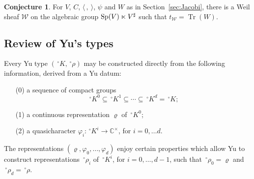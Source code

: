 \documentclass[10pt]{amsart}
\theoremstyle{plain}
\theoremstyle{definition}
\newtheorem{conjecture}[theorem]{Conjecture}
\newcommand{\CC}{{\mathbb{C}}}
\DeclareMathOperator{\trace}{Tr}
\newcommand{\trFrob}[1]{t_{#1}}
\newcommand{\cs}[1]{{\mathcal{#1}}}
\begin{document}
\begin{conjecture}\label{conj:Jacobi}
For $V$, $C$, $\langle\, , \ \rangle$, $\psi$ and $W$ as in Section~\ref{sec:Jacobi}, there is a Weil sheaf $\cs{W}$ on the algebraic group ${\operatorname{Sp}}(V)\ltimes V^\sharp$ such that $\trFrob{\cs{W}} = \trace(W)$.
\end{conjecture}

\subsection{Review of Yu's types}\label{ssec:review}

Every Yu type $(\,^\circ K,\,^\circ \rho)$ may be constructed directly from the following information, derived from a Yu datum:
\begin{enumerate}
\item[(0)] a sequence of compact groups 
\[
\,^\circ K^0 \subseteq \,^\circ K^1 \subseteq \cdots \subseteq \,^\circ K^d= \,^\circ K;
\]
\item[(1)] a continuous representation $\varrho$ of $\,^\circ K^0$;
\item[(2)] a quasicharacter $\varphi_i : \,^\circ K^i \to \CC^\times$, for $i=0, \ldots d$.
\end{enumerate}
The representations $(\varrho, \varphi_0, \ldots , \varphi_d)$ enjoy certain properties which allow Yu to construct representations $\,^\circ\rho_i$ of $\,^\circ K^i$, for $i=0, \ldots, d-1$, such that $\,^\circ\rho_0 = \varrho$ and $\,^\circ\rho_d = \,^\circ\rho$.
\end{document}
